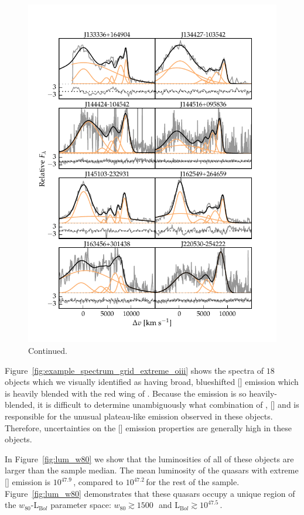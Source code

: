 \begin{figure}
\ContinuedFloat
    \centering
    \includegraphics[width=\columnwidth]{figures/chapter04/example_spectrum_grid_extreme_oiii_2.pdf} 
    \caption[]{Continued.}     
\end{figure}

Figure~\ref{fig:example_spectrum_grid_extreme_oiii} shows the spectra of $18$ objects which we visually identified as having broad, blueshifted [] emission which is heavily blended with the red wing of \hbns. 
Because the emission is so heavily-blended, it is difficult to determine unambiguously what combination of \hb, [] and  is responsible for the unusual plateau-like emission observed in these objects. 
Therefore, uncertainties on the [] emission properties are generally high in these objects. 

In Figure~\ref{fig:lum_w80} we show that the luminosities of all of these objects are larger than the sample median.
The mean luminosity of the quasars with extreme [] emission is $10^{47.9}$\,\ergs, compared to $10^{47.2}$\,\ergs for the rest of the sample. 
Figure~\ref{fig:lum_w80} demonstrates that these quasars occupy a unique region of the $w_{80}$-L$_{\mathrm Bol}$ parameter space: $w_{80}\gtrsim1500$\,\kms\, and L$_{\mathrm Bol}\gtrsim10^{47.5}$\,\ergs. 

